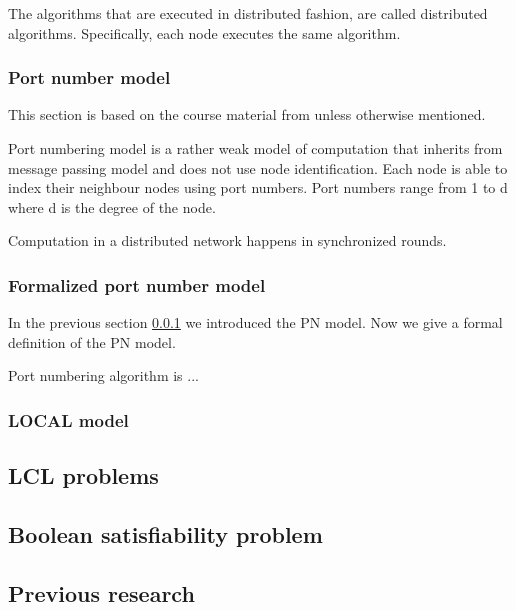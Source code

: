 The algorithms that are executed in distributed fashion, are called distributed algorithms.
Specifically, each node executes the same algorithm.



\subsubsection{Port number model} \label{sec:port_number_model}
This section is based on the course material from \cite{HirvonenSuomelaDistAlg2020} unless otherwise mentioned.

Port numbering model is a rather weak model of computation that inherits from message passing model and does not use node identification.
Each node is able to index their neighbour nodes using port numbers.
Port numbers range from 1 to d where d is the degree of the node.

Computation in a distributed network happens in synchronized rounds.

\subsubsection{Formalized port number model}
In the previous section \ref{sec:port_number_model} we introduced the PN model.
Now we give a formal definition of the PN model.


Port numbering algorithm is ...



\subsubsection{LOCAL model} \label{sec:local_model}

\subsection{LCL problems} \label{sec:lcl_problems}

\subsection{Boolean satisfiability problem}

\subsection{Previous research} \label{sec:previous_research}


\clearpage

